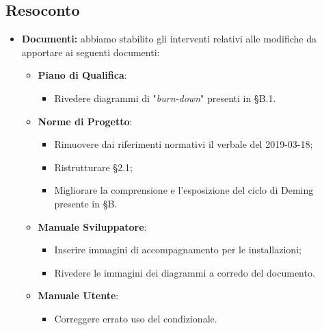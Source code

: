 \subsection{Resoconto}
\begin{itemize}
	\item{ \textbf{Documenti:} abbiamo stabilito gli interventi relativi alle modifiche da apportare ai seguenti documenti:
		\begin{itemize}
			\item \textbf{Piano di Qualifica}: 
			\begin{itemize}
				\item Rivedere diagrammi di "\emph{burn-down}" presenti in §B.1.
			\end{itemize}
			\item \textbf{Norme di Progetto}:
			\begin{itemize}
				\item Rimuovere dai riferimenti normativi il verbale del 2019-03-18;
				\item Ristrutturare §2.1;
				\item Migliorare la comprensione e l'esposizione del ciclo di Deming presente in §B.
			\end{itemize}
					\item \textbf{Manuale Sviluppatore}:
			\begin{itemize}
				\item Inserire immagini di accompagnamento per le installazioni;
				\item Rivedere le immagini dei diagrammi a corredo del documento.
			\end{itemize}
				\item \textbf{Manuale Utente}:
			\begin{itemize}
				\item Correggere errato uso del condizionale.
			\end{itemize}
		\end{itemize}}	

\end{itemize}

